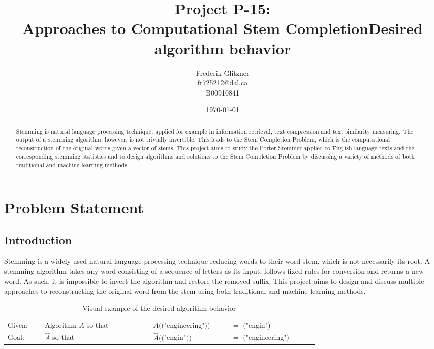 \documentclass[11pt]{article}
\title{Project P-15:\\Approaches to Computational Stem Completion}
\author{Frederik Glitzner\\fr725212@dal.ca\\B00910841}
\date{\today}
\begin{document}
\maketitle

\begin{abstract}
    Stemming is natural language processing technique, applied for example in information retrieval, text compression and text similarity measuring. The output of a stemming algorithm, however, is not trivially invertible. This leads to the Stem Completion Problem, which is the computational reconstruction of the original words given a vector of stems. This project aims to study the Porter Stemmer applied to English language texts and the corresponding stemming statistics and to design algorithms and solutions to the Stem Completion Problem by discussing a variety of methods of both traditional and machine learning methods.
\end{abstract}

\tableofcontents
\listoffigures
\listoftables



\section{Problem Statement}

\subsection{Introduction}

Stemming is a widely used natural language processing technique reducing words to their word stem, which is not necessarily its root. A stemming algorithm takes any word consisting of a sequence of letters as its input, follows fixed rules for conversion and returns a new word.
As such, it is impossible to invert the algorithm and restore the removed suffix. This project aims to design and discuss multiple approaches to reconstructing the original word from the stem using both traditional and machine learning methods.

\begin{table}[!ht]
    \centering
    \title{\Large Desired algorithm behavior\\}
    \begin{tabular}{p{0.08\linewidth}p{0.25\linewidth}p{0.18\linewidth}p{0.2\linewidth}}
        Given: & Algorithm $A$ so that & $A(($"engineering"$))$ &$=$ ("engin") \\
        Goal: & $\hat{A}$ so that & $\hat{A}(($"engin"$))$ &$=$ ("engineering") \\
    \end{tabular}
    \caption{Visual example of the desired algorithm behavior}
\end{table}
\end{document}
